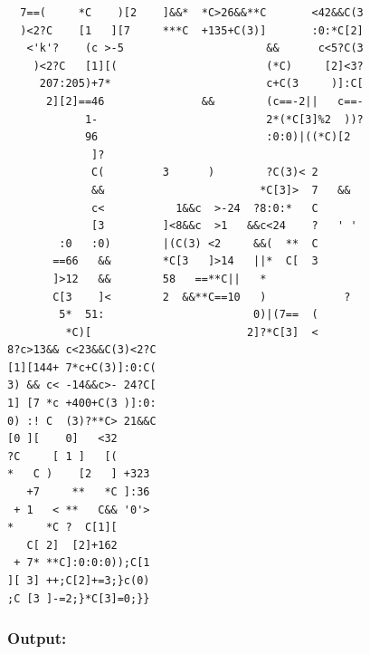 \documentclass[11pt]{article}
\begin{document}
\begin{lstlisting}
  7==(     *C    )[2    ]&&*  *C>26&&**C       <42&&C(3
  )<2?C    [1   ][7     ***C  +135+C(3)]       :0:*C[2]
   <'k'?    (c >-5                      &&      c<5?C(3
    )<2?C   [1][(                       (*C)     [2]<3?
     207:205)+7*                        c+C(3     )]:C[
      2][2]==46               &&        (c==-2||   c==-
            1-                          2*(*C[3]%2  ))?
            96                          :0:0)|((*C)[2
             ]?
             C(         3      )        ?C(3)< 2
             &&                        *C[3]>  7   &&
             c<           1&&c  >-24  ?8:0:*   C
             [3         ]<8&&c  >1   &&c<24    ?   ' '
        :0   :0)        |(C(3) <2     &&(  **  C
       ==66   &&        *C[3   ]>14   ||*  C[  3
       ]>12   &&        58   ==**C||   *
       C[3    ]<        2  &&**C==10   )            ?
        5*  51:                       0)|(7==  (
         *C)[                        2]?*C[3]  <
8?c>13&& c<23&&C(3)<2?C
[1][144+ 7*c+C(3)]:0:C(
3) && c< -14&&c>- 24?C[
1] [7 *c +400+C(3 )]:0:
0) :! C  (3)?**C> 21&&C
[0 ][    0]   <32
?C     [ 1 ]   [(
*   C )    [2   ] +323
   +7     **   *C ]:36
 + 1   < **   C&& '0'>
*     *C ?  C[1][
   C[ 2]  [2]+162
 + 7* **C]:0:0:0));C[1
][ 3] ++;C[2]+=3;}c(0)
;C [3 ]-=2;}*C[3]=0;}}

\end{lstlisting}

\pagebreak

\subsubsection*{Output:}
\end{document}
